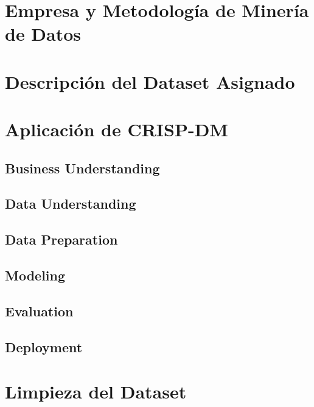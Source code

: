 \section{Empresa y Metodología de Minería de Datos}


\section{Descripción del Dataset Asignado}


\section{Aplicación de CRISP-DM}

\subsection{Business Understanding}

\subsection{Data Understanding}

\subsection{Data Preparation}

\subsection{Modeling}

\subsection{Evaluation}

\subsection{Deployment}


\section{Limpieza del Dataset}

